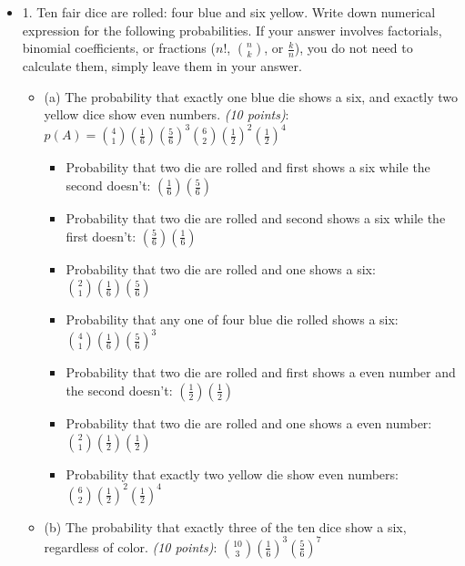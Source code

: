 \documentclass{article}
\begin{document}
\begin{itemize}
\subsection{Midterm Exam}
    \item 1. Ten fair dice are rolled: four blue and six yellow. Write down numerical expression for the following probabilities. If your answer involves factorials, binomial coefficients, or fractions ($n!$, $\binom{n}{k}$, or $\frac{k}{n}$), you do not need to calculate them, simply leave them in your answer.
    \begin{itemize}
        \item (a) The probability that exactly one blue die shows a six, and exactly two yellow dice show even numbers. \textit{(10 points)}: $p(A) = \binom{4}{1} \left( \frac{1}{6} \right) \left( \frac{5}{6} \right)^3 \binom{6}{2} \left( \frac{1}{2} \right)^2 \left( \frac{1}{2} \right)^4$
        \begin{itemize}
            \item Probability that two die are rolled and first shows a six while the second doesn't: $\left( \frac{1}{6} \right) \left( \frac{5}{6} \right)$
            \item Probability that two die are rolled and second shows a six while the first doesn't: $\left( \frac{5}{6} \right) \left( \frac{1}{6} \right)$
            \item Probability that two die are rolled and one shows a six: $\binom{2}{1} \left( \frac{1}{6} \right) \left( \frac{5}{6} \right)$
            \item Probability that any one of four blue die rolled shows a six:
            $\binom{4}{1} \left( \frac{1}{6} \right) \left( \frac{5}{6} \right)^3$
            \item Probability that two die are rolled and first shows a even number and the second doesn't:
            $\left( \frac{1}{2} \right) \left( \frac{1}{2} \right)$
            \item Probability that two die are rolled and one shows a even number: $\binom{2}{1} \left( \frac{1}{2} \right) \left( \frac{1}{2} \right)$
            \item Probability that exactly two yellow die show even numbers: $\binom{6}{2} \left( \frac{1}{2} \right)^2 \left( \frac{1}{2} \right)^4$
        \end{itemize}
        \item (b) The probability that exactly three of the ten dice show a six, regardless of color. \textit{(10 points)}: $\binom{10}{3} \left( \frac{1}{6} \right)^3 \left( \frac{5}{6} \right)^7$

\end{itemize}
\end{itemize}
\end{document}
